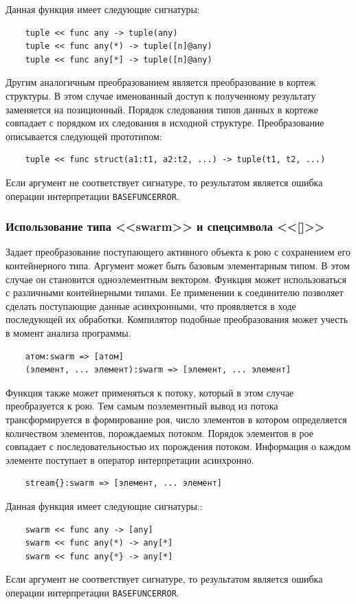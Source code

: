 Данная функция имеет следующие сигнатуры:
\begin{verbatim}
    tuple << func any -> tuple(any)
    tuple << func any(*) -> tuple([n]@any)
    tuple << func any[*] -> tuple([n]@any)
\end{verbatim}

Другим аналогичным преобразованием является преобразование в кортеж структуры. В этом случае именованный доступ к полученному результату заменяется на позиционный. Порядок следования типов данных в кортеже совпадает с порядком их следования в исходной структуре. Преобразование описывается следующей прототипом:
\begin{verbatim}
    tuple << func struct(a1:t1, a2:t2, ...) -> tuple(t1, t2, ...)
\end{verbatim}

Если аргумент не соответствует сигнатуре, то результатом является ошибка операции интерпретации \verb|BASEFUNCERROR|.

\subsubsection{Использование типа <<swarm>> и спецсимвола <<[]>>}

Задает преобразование поступающего активного объекта к рою с сохранением его контейнерного типа. Аргумент может быть базовым элементарным типом. В этом случае он становится одноэлементным вектором. Функция может использоваться с различными контейнерными типами. Ее применении к соединителю позволяет сделать поступающие данные асинхронными, что проявляется в ходе последующей их обработки. Компилятор подобные преобразования может учесть в момент анализа программы.
\begin{verbatim}
    атом:swarm => [атом]
    (элемент, ... элемент):swarm => [элемент, ... элемент]
\end{verbatim}

Функция также может применяться к потоку, который в этом случае преобразуется к рою. Тем самым поэлементный вывод из потока трансформируется в формирование роя, число элементов в котором определяется количеством элементов, порождаемых потоком. Порядок элементов в рое совпадает с последовательностью их порождения потоком. Информация о каждом элементе поступает в оператор интерпретации асинхронно.
\begin{verbatim}
    stream{}:swarm => [элемент, ... элемент]
\end{verbatim}

Данная функция имеет следующие сигнатуры::
\begin{verbatim}
    swarm << func any -> [any]
    swarm << func any(*) -> any[*]
    swarm << func any{*} -> any[*]
\end{verbatim}
Если аргумент не соответствует сигнатуре, то результатом является ошибка операции интерпретации \verb|BASEFUNCERROR|.

